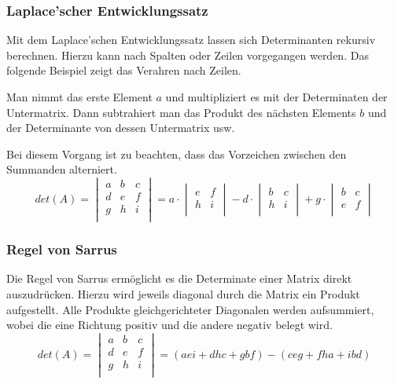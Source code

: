 \subsubsection{Laplace'scher Entwicklungssatz}
Mit dem Laplace'schen Entwicklungssatz lassen sich Determinanten
rekursiv berechnen. Hierzu kann nach Spalten oder Zeilen vorgegangen
werden. Das folgende Beispiel zeigt das Verahren nach Zeilen. 

Man nimmt das erste Element $a$ und multipliziert es mit der Determinaten
der Untermatrix. Dann subtrahiert man das Produkt des nächsten Elements 
$b$ und der Determinante von dessen Untermatrix usw. 

Bei diesem Vorgang ist zu beachten, dass das Vorzeichen zwischen den
Summanden alterniert. 
\[  
    det(A)
        =   \begin{vmatrix}
                a & b & c \\
                d & e & f \\
                g & h & i \\
            \end{vmatrix}
        = a \cdot 
            \begin{vmatrix} 
                e & f \\
                h & i \\
            \end{vmatrix}
            - 
            d \cdot 
            \begin{vmatrix}
                b & c \\
                h & i \\
            \end{vmatrix}
            + 
            g \cdot 
            \begin{vmatrix}
                b & c \\
                e & f \\
            \end{vmatrix} 
\]

\subsubsection{Regel von Sarrus}
Die Regel von Sarrus ermöglicht es die Determinate einer Matrix direkt
auszudrücken. Hierzu wird jeweils diagonal durch die Matrix ein Produkt
aufgestellt. Alle Produkte gleichgerichteter Diagonalen werden 
aufsummiert, wobei die eine Richtung positiv und die andere negativ
belegt wird.
\[  
    det(A)
        =   \begin{vmatrix}
                a & b & c \\
                d & e & f \\
                g & h & i \\
            \end{vmatrix}
        = (aei + dhc + gbf) - (ceg + fha + ibd)
\]


